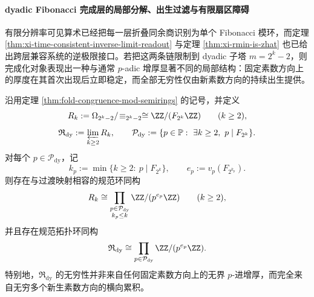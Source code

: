 \paragraph{dyadic Fibonacci 完成层的局部分解、出生过滤与有限扇区障碍}
有限分辨率可见算术已经把每一层折叠同余商识别为单个 Fibonacci 模环，而定理 \ref{thm:xi-time-consistent-inverse-limit-readout} 与定理 \ref{thm:xi-rmin-is-zhat} 也已给出跨层兼容系统的逆极限接口。若把这两条链限制到 dyadic 子塔 \(m=2^k-2\)，则完成化对象表现出一种与通常 \(p\)-adic 增厚显著不同的局部结构：固定素数方向上的厚度在其首次出现后立即稳定，而全部无穷性仅由新素数方向的持续出生提供。

\begin{theorem}\label{thm:xi-dyadic-fibonacci-completion-stable-local-splitting}
沿用定理 \ref{thm:fold-congruence-mod-semirings} 的记号，并定义
\[
R_k:=\Omega_{2^k-2}/\!\equiv_{2^k-2}
\cong
\ZZ/(F_{2^k}\ZZ)
\qquad(k\ge 2),
\]
\[
\mathfrak R_{\mathrm{dy}}
:=
\varprojlim_{k\ge 2}R_k,
\qquad
\mathcal P_{\mathrm{dy}}
:=
\{p\in\mathbb P:\ \exists k\ge 2,\ p\mid F_{2^k}\}.
\]
对每个 \(p\in\mathcal P_{\mathrm{dy}}\)，记
\[
k_p:=\min\{k\ge 2:\ p\mid F_{2^k}\},
\qquad
e_p:=v_p(F_{2^{k_p}}).
\]
则存在与过渡映射相容的规范环同构
\[
R_k
\cong
\prod_{\substack{p\in\mathcal P_{\mathrm{dy}}\\ k_p\le k}}
\ZZ/(p^{e_p}\ZZ)
\qquad(k\ge 2),
\]
并且存在规范拓扑环同构
\[
\mathfrak R_{\mathrm{dy}}
\cong
\prod_{p\in\mathcal P_{\mathrm{dy}}}\ZZ/(p^{e_p}\ZZ).
\]
特别地，\(\mathfrak R_{\mathrm{dy}}\) 的无穷性并非来自任何固定素数方向上的无界 \(p\)-进增厚，而完全来自无穷多个新生素数方向的横向累积。
\end{theorem}

